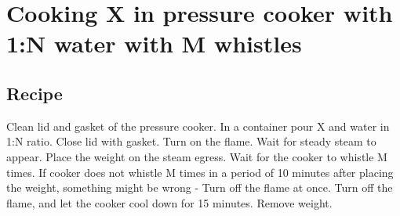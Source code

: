 \documentclass[oneside, article]{memoir}
\begin{document}
\section{Cooking X in pressure cooker with 1:N water with M whistles}
\subsection{Recipe}
Clean lid and gasket of the pressure cooker. In a container pour X and water in 1:N ratio. Close lid with gasket. Turn on the flame. Wait for steady steam to appear. Place the weight on the steam egress. Wait for the cooker to whistle M times. If cooker does not whistle M times in a period of 10 minutes after placing the weight, something might be wrong - Turn off the flame at once. Turn off the flame, and let the cooker cool down for 15 minutes. Remove weight.
\end{document}

